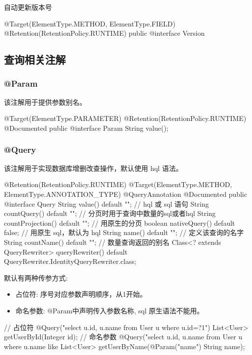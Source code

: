 自动更新版本号

\begin{Java}
@Target({ElementType.METHOD, ElementType.FIELD})
@Retention(RetentionPolicy.RUNTIME)
public @interface Version {
}
\end{Java}

\subsection{查询相关注解}

\subsubsection{@Param}

该注解用于提供参数别名。

\begin{Java}
@Target({ElementType.PARAMETER})
@Retention(RetentionPolicy.RUNTIME)
@Documented
public @interface Param {
    String value();
}
\end{Java}

\subsubsection{@Query}

该注解用于实现数据库增删改查操作，默认使用 hql 语法。

\begin{Java}
@Retention(RetentionPolicy.RUNTIME)
@Target({ElementType.METHOD, ElementType.ANNOTATION_TYPE})
@QueryAnnotation
@Documented
public @interface Query {
    String value() default "";      // hql 或 sql 语句
    String countQuery() default "";     // 分页时用于查询中数量的sql或者hql
    String countProjection() default "";    // 用原生的分页
    boolean nativeQuery() default false;    // 用原生 sql，默认为 hql
    String name() default "";   // 定义该查询的名字
    String countName() default "";  // 数量查询返回的别名
    Class<? extends QueryRewriter> queryRewriter() default QueryRewriter.IdentityQueryRewriter.class;
}
\end{Java}

默认有两种传参方式:
\begin{itemize}
    \item 占位符: 序号对应参数声明顺序，从1开始。
    \item 命名参数: @Param中声明传入参数名称, sql 原生语法不能用。
\end{itemize}

\begin{Java}
// 占位符
@Query("select u.id, u.name from User u where u.id=?1")
List<User> getUserById(Integer id);
// 命名参数
@Query("select u.id, u.name from User u where u.name like %
List<User> getUserByName(@Param("name") String name);
\end{Java}

